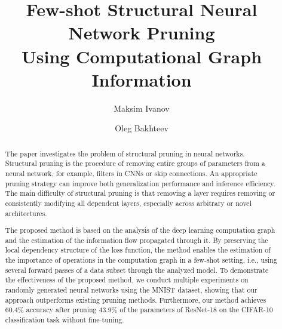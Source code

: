 \documentclass[runningheads]{llncs}
\begin{document}
%
\title{Few-shot Structural Neural Network Pruning\\Using Computational Graph Information}
%
%
\author{Maksim Ivanov \and
Oleg Bakhteev}
%
%
%
\maketitle              %
%
\begin{abstract}
The paper investigates the problem of structural pruning in neural networks. Structural pruning is the procedure of removing entire groups of parameters from a neural network, for example, filters in CNNs or skip connections. An appropriate pruning strategy can improve both generalization performance and inference efficiency. The main difficulty of structural pruning is that removing a layer requires removing or consistently modifying all dependent layers, especially across arbitrary or novel architectures.

The proposed method is based on the analysis of the deep learning computation graph and the estimation of the information flow propagated through it. By preserving the local dependency structure of the loss function, the method enables the estimation of the importance of operations in the computation graph in a few-shot setting, i.e., using several forward passes of a data subset through the analyzed model. To demonstrate the effectiveness of the proposed method, we conduct multiple experiments on randomly generated neural networks using the MNIST dataset, showing that our approach outperforms existing pruning methods. Furthermore, our method achieves 60.4\% accuracy after pruning 43.9\% of the parameters of ResNet-18 on the CIFAR-10 classification task without fine-tuning.

\end{abstract}
%
%
%
\end{document}
